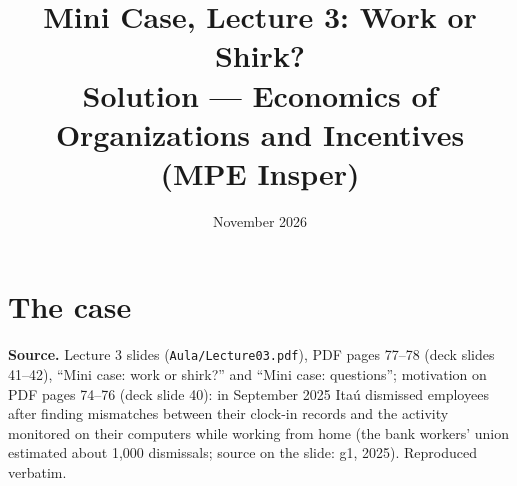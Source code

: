 \documentclass[11pt,a4paper]{article}
\title{\textbf{Mini Case, Lecture 3: Work or Shirk?}\\[4pt]
  \large Solution --- Economics of Organizations and Incentives (MPE Insper)}
\date{November 2026}
\begin{document}
\maketitle
\thispagestyle{empty}

\section*{The case}

\textbf{Source.} Lecture 3 slides (\texttt{Aula/Lecture03.pdf}), PDF pages 77--78 (deck slides
41--42), ``Mini case: work or shirk?'' and ``Mini case: questions''; motivation on PDF pages 74--76
(deck slide 40): in September 2025 Itaú dismissed employees after finding mismatches between their
clock-in records and the activity monitored on their computers while working from home (the bank
workers' union estimated about 1,000 dismissals; source on the slide: g1, 2025). Reproduced verbatim.
\end{document}
